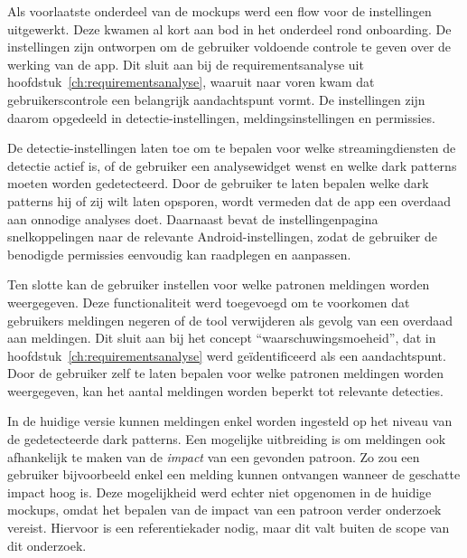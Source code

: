 \vspace{1em}

Als voorlaatste onderdeel van de mockups werd een flow voor de instellingen uitgewerkt. Deze kwamen al kort aan bod in het onderdeel rond onboarding. De instellingen zijn ontworpen om de gebruiker voldoende controle te geven over de werking van de app. Dit sluit aan bij de requirementsanalyse uit hoofdstuk~\ref{ch:requirementsanalyse}, waaruit naar voren kwam dat gebruikerscontrole een belangrijk aandachtspunt vormt. De instellingen zijn daarom opgedeeld in detectie-instellingen, meldingsinstellingen en permissies.

\vspace{1em}

De detectie-instellingen laten toe om te bepalen voor welke streamingdiensten de detectie actief is, of de gebruiker een analysewidget wenst en welke dark patterns moeten worden gedetecteerd. Door de gebruiker te laten bepalen welke dark patterns hij of zij wilt laten opsporen, wordt vermeden dat de app een overdaad aan onnodige analyses doet. Daarnaast bevat de instellingenpagina snelkoppelingen naar de relevante Android-instellingen, zodat de gebruiker de benodigde permissies eenvoudig kan raadplegen en aanpassen.

\vspace{1em}

Ten slotte kan de gebruiker instellen voor welke patronen meldingen worden weergegeven. Deze functionaliteit werd toegevoegd om te voorkomen dat gebruikers meldingen negeren of de tool verwijderen als gevolg van een overdaad aan meldingen. Dit sluit aan bij het concept ``waarschuwingsmoeheid'', dat in hoofdstuk~\ref{ch:requirementsanalyse} werd geïdentificeerd als een aandachtspunt. Door de gebruiker zelf te laten bepalen voor welke patronen meldingen worden weergegeven, kan het aantal meldingen worden beperkt tot relevante detecties.

\vspace{1em}

In de huidige versie kunnen meldingen enkel worden ingesteld op het niveau van de gedetecteerde dark patterns. Een mogelijke uitbreiding is om meldingen ook afhankelijk te maken van de \textit{impact} van een gevonden patroon. Zo zou een gebruiker bijvoorbeeld enkel een melding kunnen ontvangen wanneer de geschatte impact hoog is. Deze mogelijkheid werd echter niet opgenomen in de huidige mockups, omdat het bepalen van de impact van een patroon verder onderzoek vereist. Hiervoor is een referentiekader nodig, maar dit valt buiten de scope van dit onderzoek.

